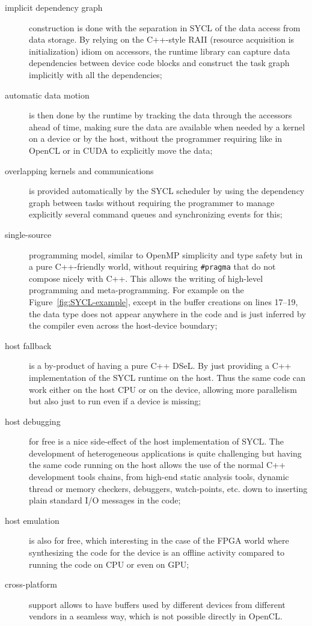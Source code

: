 \documentclass[sigplan, review, authordraft]{acmart}
\begin{document}
\begin{description}
\item[implicit dependency graph] construction is done with the
  separation in SYCL of the data access from data storage. By relying
  on the C++-style RAII (resource acquisition is initialization) idiom
  on accessors, the runtime library can capture data dependencies
  between device code blocks and construct the task graph implicitly
  with all the dependencies;

\item[automatic data motion] is then done by the runtime by tracking
  the data through the accessors ahead of time, making sure the data
  are available when needed by a kernel on a device or by the host,
  without the programmer requiring like in OpenCL or in CUDA to
  explicitly move the data;

\item[overlapping kernels and communications] is provided
  automatically by the SYCL scheduler by using the dependency graph
  between tasks without requiring the programmer to manage explicitly
  several command queues and synchronizing events for this;

\item[single-source] programming model, similar to OpenMP
  simplicity and type safety but in a pure C++-friendly world, without
  requiring \lstinline{#pragma} that do not compose nicely with
  C++. This allows the writing of high-level programming and
  meta-programming. For example on the Figure~\ref{fig:SYCL-example},
  except in the buffer creations on lines 17--19, the data type does
  not appear anywhere in the code and is just inferred by the compiler
  even across the host-device boundary;

\item[host fallback] is a by-product of having a pure C++ DSeL. By
  just providing a C++ implementation of the SYCL runtime on the
  host. Thus the same code can work either on the host CPU or on the
  device, allowing more parallelism but also just to run even if a
  device is missing;

\item[host debugging] for free is a nice side-effect of the host
  implementation of SYCL. The development of heterogeneous
  applications is quite challenging but having the same code running
  on the host allows the use of the normal C++ development tools
  chains, from high-end static analysis tools, dynamic thread or
  memory checkers, debuggers, watch-points, etc.  down to inserting
  plain standard I/O messages in the code;

\item[host emulation] is also for free, which interesting in the case
  of the FPGA world where synthesizing the code for the device
  is an offline activity compared to running the code on CPU or even on GPU;

\item[cross-platform] support allows to have buffers used by different
  devices from different vendors in a seamless way, which is not
  possible directly in OpenCL.


\end{description}
\end{document}
